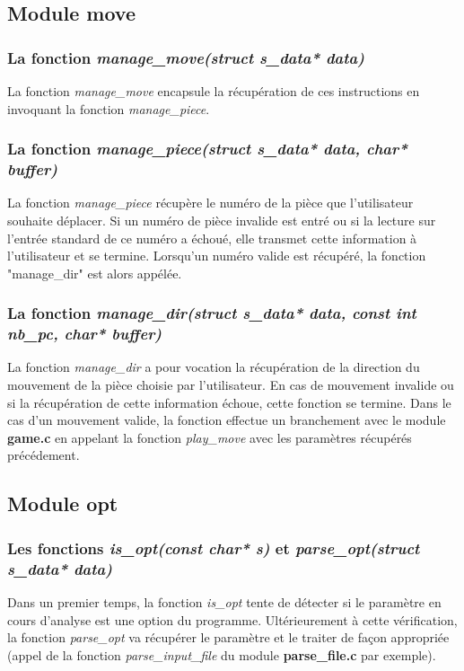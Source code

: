 \documentclass{report}
\begin{document}
\subsection{Module move}
\subsubsection*{La fonction \textit{manage\_move(struct s\_data* data)}}
La fonction \textit{manage\_move} encapsule la récupération de ces instructions en invoquant la fonction \textit{manage\_piece}.
\subsubsection*{La fonction \textit{manage\_piece(struct s\_data* data, char* buffer)}}
La fonction \textit{manage\_piece} récupère le numéro de la pièce que l'utilisateur souhaite déplacer.
Si un numéro de pièce invalide est entré ou si la lecture sur l'entrée standard de ce numéro a échoué, elle transmet cette information à l'utilisateur et se termine.
Lorsqu'un numéro valide est récupéré, la fonction "manage\_dir" est alors appélée.
\subsubsection*{La fonction \textit{manage\_dir(struct s\_data* data, const int nb\_pc, char* buffer)}}
La fonction \textit{manage\_dir} a pour vocation la récupération de la direction du mouvement de la pièce choisie par l'utilisateur.
En cas de mouvement invalide ou si la récupération de cette information échoue, cette fonction se termine.
Dans le cas d'un mouvement valide, la fonction effectue un branchement avec le module \textbf{game.c} en appelant la fonction \textit{play\_move} avec les paramètres récupérés précédement.

\subsection{Module opt}
\subsubsection*{Les fonctions \textit{is\_opt(const char* s)} et \textit{parse\_opt(struct s\_data* data)}}
Dans un premier temps, la fonction \textit{is\_opt} tente de détecter si le paramètre en cours d'analyse est une option du programme.
Ultérieurement à cette vérification, la fonction \textit{parse\_opt} va récupérer le paramètre et le traiter de façon appropriée (appel de la fonction \textit{parse\_input\_file} du module \textbf{parse\_file.c} par exemple).
\end{document}
